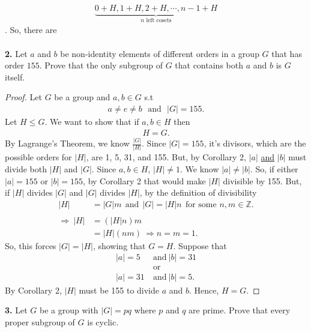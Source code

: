 \documentclass[12pt, letterpaper]{article}
\begin{document}
    \begin{align*}
        \underbrace{0 + H, 1 + H, 2 + H, \cdots, n-1 + H}_{\text{$n$ left cosets}}
    \end{align*}.
     So, there are  \\ \\
\vspace{0.2em}
\textbf{2.} Let $a$ and $b$ be non-identity elements of different orders in a group $G$ that has order $155$. Prove that the only subgroup of $G$ that contains both $a$ and $b$ is $G$ itself. 
\begin{proof}
    Let $G$ be a group and $a,b \in G$ s.t
    \begin{align*}
        a \neq e \neq b \ \ \ \text{and} \ \ \ |G| = 155.
    \end{align*}
    Let $H \leq G$. We want to show that if $a,b \in H$ then
    \begin{align*}
        H = G.
    \end{align*}
    By Lagrange's Theorem, we know $\frac{|G|}{|H|}.$ Since $|G| = 155$, it's divisors, which are the possible orders for $|H|$, are 1, 5, 31, and 155. But, by Corollary 2, $|a|$ \underline{and} $|b|$ must divide both $|H|$ and $|G|$. Since $a,b \in H$, $|H| \neq 1$. We know $|a| \neq |b|$. So, if either $|a| = 155$ or $|b| = 155$, by Corollary 2 that would make $|H|$ divisible by 155. But, if $|H|$ divides $|G|$ and $|G|$ divides $|H|$, by the definition of divisibility
    \begin{align*}
        |H| &= |G|m \ \ \text{and} \ \ |G| = |H|n \ \ \text{for some $n, m \in \mathbb{Z}$}.\\ \\
        \Rightarrow \ |H| &= (|H|n)m \\
        &= |H|(nm) \ \Rightarrow n = m=1.
    \end{align*}
    So, this forces $|G| = |H|$, showing that $G = H$. Suppose that
    \begin{align*}
        |a| = 5 \ &\text{and} \ |b| = 31 \\
        &\text{or} \\
        |a| = 31 \ &\text{and} \ |b| = 5.
    \end{align*}
   By Corollary 2, $|H|$ must be 155 to divide $a$ and $b$. Hence, $H = G$.
\end{proof}
\vspace{0.2em}
\textbf{3.} Let $G$ be a group with $|G| = pq$ where $p$ and $q$ are prime. Prove that every proper subgroup of $G$ is cyclic.
\end{document}
